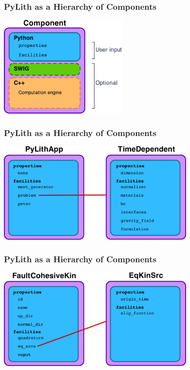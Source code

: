 \documentclass{beamer}
\begin{document}
\begin{frame}
  \frametitle{PyLith as a Hierarchy of Components}

  \vfill
  \begin{center}
    \includegraphics[height=2.0in]{figs/component}
  \end{center}  
  \vfill

\end{frame}


\begin{frame}
  \frametitle{PyLith as a Hierarchy of Components}

  \vfill
  \begin{center}
    \includegraphics[height=2.0in]{figs/pylithapp}
  \end{center}  
  \vfill

\end{frame}


\begin{frame}
  \frametitle{PyLith as a Hierarchy of Components}

  \vfill
  \begin{center}
    \includegraphics[height=2.0in]{figs/faultcohesivekin}
  \end{center}  
  \vfill

\end{frame}
\end{document}

